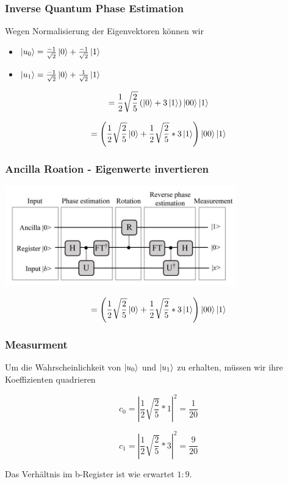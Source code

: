 \begin{frame}
    \frametitle{Inverse Quantum Phase Estimation}

Wegen Normalisierung der Eigenvektoren können wir 

\begin{itemize}
    \item $ \ket{u_0} = \frac{-1}{\sqrt{2}}\ket{0} + \frac{-1}{\sqrt{2}}\ket{1}$ 
    \item $ \ket{u_1}= \frac{-1}{\sqrt{2}}\ket{0} + \frac{1}{\sqrt{2}}\ket{1}$ 
\end{itemize}

$$ = \frac{1}{2}\sqrt{\frac{2}{5}} \left( \ket{0} + 3\ket{1} \right)  \ket{00} \ket{1} $$

$$ = \left(\frac{1}{2}\sqrt{\frac{2}{5}} \ket{0} +\frac{1}{2}\sqrt{\frac{2}{5}} * 3 \ket{1} \right) \ket{00} \ket{1} $$

\end{frame}

\begin{frame}
    \frametitle{Ancilla Roation - Eigenwerte invertieren}
    \begin{center}
    \includegraphics[width=10cm]{img/hhl_circuit.jpg}
    \end{center}

$$ = \left(\frac{1}{2}\sqrt{\frac{2}{5}} \ket{0} +\frac{1}{2}\sqrt{\frac{2}{5}} * 3 \ket{1} \right) \ket{00} \ket{1} $$
\end{frame}


\begin{frame}
    \frametitle{Measurment}

Um die Wahrscheinlichkeit von $ \ket{u_0}$ und $\ket{u_1}$ zu erhalten, müssen wir ihre Koeffizienten quadrieren

$$ c_0=\left|\frac{1}{2}\sqrt{\frac{2}{5}}*1\right|^2 = \frac{1}{20} $$

$$ c_1=\left|\frac{1}{2}\sqrt{\frac{2}{5}}*3\right|^2 = \frac{9}{20} $$

Das Verhältnis im b-Register ist wie erwartet $1:9$.

\end{frame}



